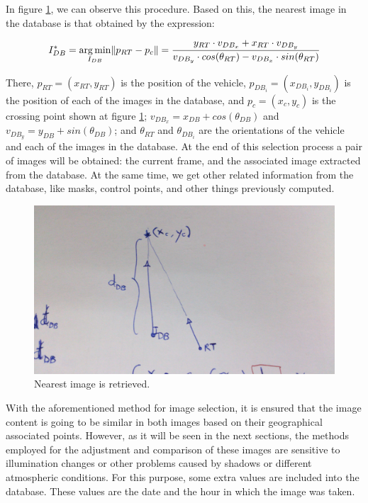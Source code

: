 In figure \ref{fig:cp01_nearest_image}, we can observe this procedure. Based on this, the nearest image in the database is that obtained by the expression:

\begin{equation}\label{eq:cp01_nearest_image}
I^*_{DB} = \underset{I_{DB}}{\arg\min} \|p_{RT} - p_c\| = {{y_{RT} \cdot v_{DB_x} + x_{RT} \cdot v_{DB_y}} \over 
  {v_{DB_y} \cdot cos(\theta_{RT}) - v_{DB_x} \cdot sin(\theta_{RT})}}
\end{equation}

There, $p_{RT} = (x_{RT}, y_{RT})$ is the position of the vehicle, $p_{DB_i} = (x_{DB_i}, y_{DB_i})$ is the position of each of the images in the database, and $p_c = (x_c, y_c)$ is the crossing point shown at figure \ref{fig:cp01_nearest_image}; $v_{DB_x} = x_{DB} + cos(\theta_{DB})$ and $v_{DB_y} = y_{DB} + sin(\theta_{DB})$; and 
$\theta_{RT}$ and $\theta_{DB_i}$ are the orientations of the vehicle and each of the images in the database. At the end of this selection process a pair of images will be obtained: the current frame, and the associated image extracted from the database. At the same time, we get other related information from the database, like masks, control points, and other things previously computed.

\begin{figure}[thb]
  \centering
  \includegraphics{nearest_image}
  \caption{Nearest image is retrieved.}
  \label{fig:cp01_nearest_image}
\end{figure}

With the aforementioned method for image selection, it is ensured that the image content is going to be similar in both images based on their geographical associated points. However, as it will be seen in the next sections, the methods employed for the adjustment and comparison of these images are sensitive to illumination changes or other problems caused by shadows or different atmospheric conditions. For this purpose, some extra values are included into the database. These values are the date and the hour in which the image was taken.

